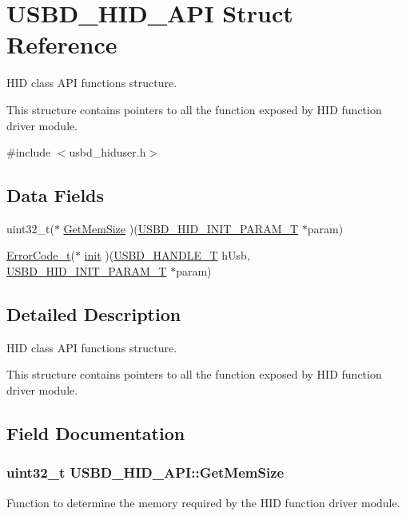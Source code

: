 \hypertarget{structUSBD__HID__API}{\section{U\-S\-B\-D\-\_\-\-H\-I\-D\-\_\-\-A\-P\-I Struct Reference}
\label{structUSBD__HID__API}
}


H\-I\-D class A\-P\-I functions structure.

This structure contains pointers to all the function exposed by H\-I\-D function driver module.  




{\ttfamily \#include $<$usbd\-\_\-hiduser.\-h$>$}

\subsection*{Data Fields}
\begin{DoxyCompactItemize}
\item 
uint32\-\_\-t($\ast$ \hyperlink{structUSBD__HID__API_a020839a4e29677899bb7a0a2c11b1252}{Get\-Mem\-Size} )(\hyperlink{group__USBD__HID_ga192251fa5ec461eaa9a77b76dbe7c3fa}{U\-S\-B\-D\-\_\-\-H\-I\-D\-\_\-\-I\-N\-I\-T\-\_\-\-P\-A\-R\-A\-M\-\_\-\-T} $\ast$param)
\item 
\hyperlink{error_8h_a905255056c349318139d94aa4523d516}{Error\-Code\-\_\-t}($\ast$ \hyperlink{structUSBD__HID__API_a7b98c434713f1deb07abafcb52fae76d}{init} )(\hyperlink{group__USBD__Core_gafdbb2204d929cb9d75736bd2b42342ac}{U\-S\-B\-D\-\_\-\-H\-A\-N\-D\-L\-E\-\_\-\-T} h\-Usb, \hyperlink{group__USBD__HID_ga192251fa5ec461eaa9a77b76dbe7c3fa}{U\-S\-B\-D\-\_\-\-H\-I\-D\-\_\-\-I\-N\-I\-T\-\_\-\-P\-A\-R\-A\-M\-\_\-\-T} $\ast$param)
\end{DoxyCompactItemize}


\subsection{Detailed Description}
H\-I\-D class A\-P\-I functions structure.

This structure contains pointers to all the function exposed by H\-I\-D function driver module. 



\subsection{Field Documentation}
\hypertarget{structUSBD__HID__API_a020839a4e29677899bb7a0a2c11b1252}{
\subsubsection[{Get\-Mem\-Size}]{\setlength{\rightskip}{0pt plus 5cm}uint32\-\_\-t U\-S\-B\-D\-\_\-\-H\-I\-D\-\_\-\-A\-P\-I\-::\-Get\-Mem\-Size}}\label{structUSBD__HID__API_a020839a4e29677899bb7a0a2c11b1252}
Function to determine the memory required by the H\-I\-D function driver module.

